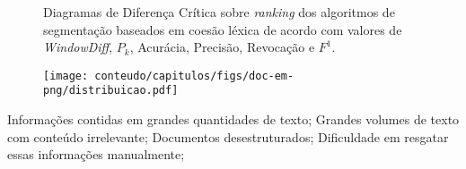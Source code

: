 










\begin{figure}[!h]
	\centering     %


		\caption{Diagramas de Diferença Crítica sobre \textit{ranking} dos algoritmos de segmentação baseados em coesão léxica de acordo com valores de \textit{WindowDiff}, $P_k$, Acurácia, Precisão, Revocação e $F^1$.}
	\label{fig:CDs}
\end{figure}







  \begin{center}
	\begin{figure}[h!]

		\texttt{[image: conteudo/capitulos/figs/doc-em-png/distribuicao.pdf]}

	\end{figure}
\end{center}


\label{fig:distribuicao-ata}

\caption{Distribuição de tópicos em uma ata real. Cada tópico é representado por uma região colorida. Abaixo estão os descritores identificados pela cor do respectivo tópico. Os nomes de pessoas foram ocultados por não expressarem significado nesse trabalho.}





Informações contidas em grandes quantidades de texto;
Grandes volumes de texto com conteúdo irrelevante;
Documentos desestruturados;
Dificuldade em resgatar essas informações manualmente;


